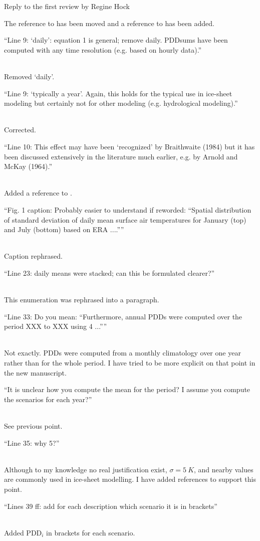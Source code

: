 \documentclass{letter}
\newcommand{\rev}[0]{\color{blue!50!black}\it}
\newcommand{\revpoint}[1]{{\rev\item``#1''}\\}
\begin{document}
\begin{letter}{Reply to the first review by Regine Hock}
\begin{enumerate}[resume]
    The reference to \citet{braithwaite-1984} has been moved and a reference to \citet{hock-2003} has been added.

    \revpoint{Line 9: ‘daily’: equation 1 is general; remove daily. PDDsums have been computed with any time resolution (e.g. based on hourly data).}

    Removed `daily'.

    \revpoint{Line 9: ‘typically a year’. Again, this holds for the typical use in ice-sheet modeling but certainly not for other modeling (e.g. hydrological modeling).}

    Corrected.

    \revpoint{Line 10: This effect may have been ‘recognized’ by Braithwaite (1984) but it has been discussed extensively in the literature much earlier, e.g. by Arnold and McKay (1964).}

    Added a reference to \citet{arnold-mackay-1964}.

    \revpoint{Fig. 1 caption: Probably easier to understand if reworded: “Spatial distribution of standard deviation of daily mean surface air temperatures for January (top) and July (bottom) based on ERA ....”}

    Caption rephrased.

    \revpoint{Line 23: daily means were stacked; can this be formulated clearer?}

    This enumeration was rephrased into a paragraph.

    \revpoint{Line 33: Do you mean: “Furthermore, annual PDDs were computed over the period XXX to XXX using 4 ...”}

    Not exactly. PDDs were computed from a monthly climatology over one year rather than for the whole period. I have tried to be more explicit on that point in the new manuscript.

    \revpoint{It is unclear how you compute the mean for the period? I assume you compute the scenarios for each year?}

    See previous point.

    \revpoint{Line 35: why 5?}

    Although to my knowledge no real justification exist, $\sigma = 5~K$, and nearby values are commonly used in ice-sheet modelling. I have added references to support this point.

    \revpoint{Lines 39 ff: add for each description which scenario it is in brackets}

    Added $\textrm{PDD}_i$ in brackets for each scenario.


\end{enumerate}
\end{letter}
\end{document}
